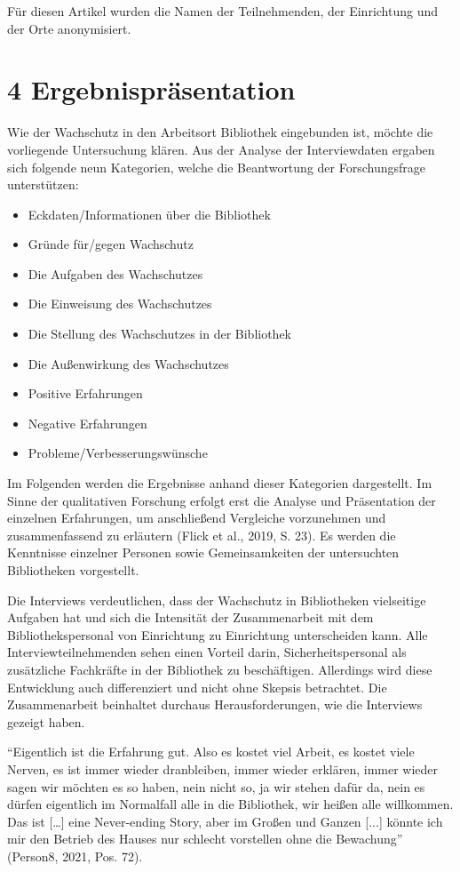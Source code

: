 \documentclass[a4paper,
fontsize=11pt,
oneside,
numbers=noperiodatend,
parskip=half-,
bibliography=totoc,
final
]{scrartcl}
\begin{document}
Für diesen Artikel wurden die Namen der Teilnehmenden, der Einrichtung
und der Orte anonymisiert.

\hypertarget{ergebnispruxe4sentation}{%
\section{4 Ergebnispräsentation}\label{ergebnispruxe4sentation}}

Wie der Wachschutz in den Arbeitsort Bibliothek eingebunden ist, möchte
die vorliegende Untersuchung klären. Aus der Analyse der Interviewdaten
ergaben sich folgende neun Kategorien, welche die Beantwortung der
Forschungsfrage unterstützen:

\begin{itemize}
\item
  Eckdaten/Informationen über die Bibliothek
\item
  Gründe für/gegen Wachschutz
\item
  Die Aufgaben des Wachschutzes
\item
  Die Einweisung des Wachschutzes
\item
  Die Stellung des Wachschutzes in der Bibliothek
\item
  Die Außenwirkung des Wachschutzes
\item
  Positive Erfahrungen
\item
  Negative Erfahrungen
\item
  Probleme/Verbesserungswünsche
\end{itemize}

Im Folgenden werden die Ergebnisse anhand dieser Kategorien dargestellt.
Im Sinne der qualitativen Forschung erfolgt erst die Analyse und
Präsentation der einzelnen Erfahrungen, um anschließend Vergleiche
vorzunehmen und zusammenfassend zu erläutern (Flick et al., 2019, S.
23). Es werden die Kenntnisse einzelner Personen sowie Gemeinsamkeiten
der untersuchten Bibliotheken vorgestellt.

Die Interviews verdeutlichen, dass der Wachschutz in Bibliotheken
vielseitige Aufgaben hat und sich die Intensität der Zusammenarbeit mit
dem Bibliothekspersonal von Einrichtung zu Einrichtung unterscheiden
kann. Alle Interviewteilnehmenden sehen einen Vorteil darin,
Sicherheitspersonal als zusätzliche Fachkräfte in der Bibliothek zu
beschäftigen. Allerdings wird diese Entwicklung auch differenziert und
nicht ohne Skepsis betrachtet. Die Zusammenarbeit beinhaltet durchaus
Herausforderungen, wie die Interviews gezeigt haben.

\enquote{Eigentlich ist die Erfahrung gut. Also es kostet viel Arbeit,
es kostet viele Nerven, es ist immer wieder dranbleiben, immer wieder
erklären, immer wieder sagen wir möchten es so haben, nein nicht so, ja
wir stehen dafür da, nein es dürfen eigentlich im Normalfall alle in die
Bibliothek, wir heißen alle willkommen. Das ist {[}\ldots{]} eine
Never-ending Story, aber im Großen und Ganzen {[}...{]} könnte ich mir
den Betrieb des Hauses nur schlecht vorstellen ohne die Bewachung}\\
(Person8, 2021, Pos. 72).
\end{document}
